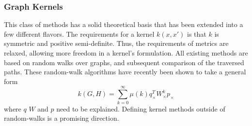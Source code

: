 \documentclass[11pt]{article}
\begin{document}
\subsubsection{Graph Kernels}
This class of methods has a solid theoretical basis that has been extended into a few different flavors. The requirements for a kernel $k(x,x')$ is that $k$ is symmetric and positive semi-definite. Thus, the requirements of metrics are relaxed, allowing more freedom in a kernel's formulation. All existing methods are based on random walks over graphs, and subsequent comparison of the traversed paths. These random-walk algorithms have recently been shown to take a general form
\[
k(G,H) = \sum\limits_{k=0}^{\infty}\mu(k)q_{\times}^{T}W_{\times}^{k}p_{\times}
\]
where $q$ $W$ and $p$ need to be explained. Defining kernel methods outside of random-walks is a promising direction.
\end{document}
